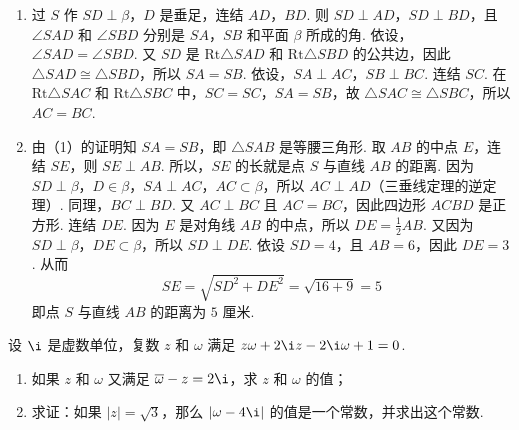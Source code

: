 \documentclass[UTF8,a4paper,oneside,11pt]{ctexbook}
\begin{document}
\begin{solution}
\begin{enumerate}
\item 过 \(S\) 作 \(SD\perp \beta\)，\(D\) 是垂足，连结 \(AD\)，\(BD\). 则 \(SD\perp AD\)，\(SD\perp BD\)，且 \(\angle SAD\) 和 \(\angle SBD\) 分别是 \(SA\)，\(SB\) 和平面 \(\beta\) 所成的角. 依设，\(\angle SAD=\angle SBD\). 又 \(SD\) 是 \(\mathrm{Rt}\triangle SAD\) 和 \(\mathrm{Rt}\triangle SBD\) 的公共边，因此 \(\triangle SAD\cong \triangle SBD\)，所以 \(SA=SB\).
依设，\(SA\perp AC\)，\(SB\perp BC\). 连结 \(SC\). 在 \(\mathrm{Rt}\triangle SAC\) 和 \(\mathrm{Rt}\triangle SBC\) 中，\(SC=SC\)，\(SA=SB\)，故 \(\triangle SAC\cong \triangle SBC\)，所以 \(AC=BC\).

\item 由（1）的证明知 \(SA=SB\)，即 \(\triangle SAB\) 是等腰三角形. 取 \(AB\) 的中点 \(E\)，连结 \(SE\)，则 \(SE\perp AB\). 所以，\(SE\) 的长就是点 \(S\) 与直线 \(AB\) 的距离.
因为 \(SD\perp \beta\)，\(D\in \beta\)，\(SA\perp AC\)，\(AC\subset \beta\)，所以 \(AC\perp AD\)（三垂线定理的逆定理）. 同理，\(BC\perp BD\). 又 \(AC\perp BC\) 且 \(AC=BC\)，因此四边形 \(ACBD\) 是正方形.
连结 \(DE\). 因为 \(E\) 是对角线 \(AB\) 的中点，所以 \(DE=\frac{1}{2}AB\). 又因为 \(SD\perp \beta\)，\(DE\subset \beta\)，所以 \(SD\perp DE\). 依设 \(SD=4\)，且 \(AB=6\)，因此 \(DE=3\). 从而
\[
SE=\sqrt{SD^2+DE^2}=\sqrt{16+9}=5
\]
即点 \(S\) 与直线 \(AB\) 的距离为 \(5\text{ 厘米}\).
\end{enumerate}
\end{solution}

\begin{problem}
设 \(\i\) 是虚数单位，复数 \(z\) 和 \(\omega\) 满足 \(z\omega+2\i z-2\i\omega+1=0\).

\begin{enumerate}
\item 如果 \(z\) 和 \(\omega\) 又满足 \(\overline{\omega}-z=2\i\)，求 \(z\) 和 \(\omega\) 的值；
\item 求证：如果 \(\left| z \right|=\sqrt{3}\)，那么 \(\left| \omega-4\i \right|\) 的值是一个常数，并求出这个常数.
\end{enumerate}
\end{problem}
\end{document}
